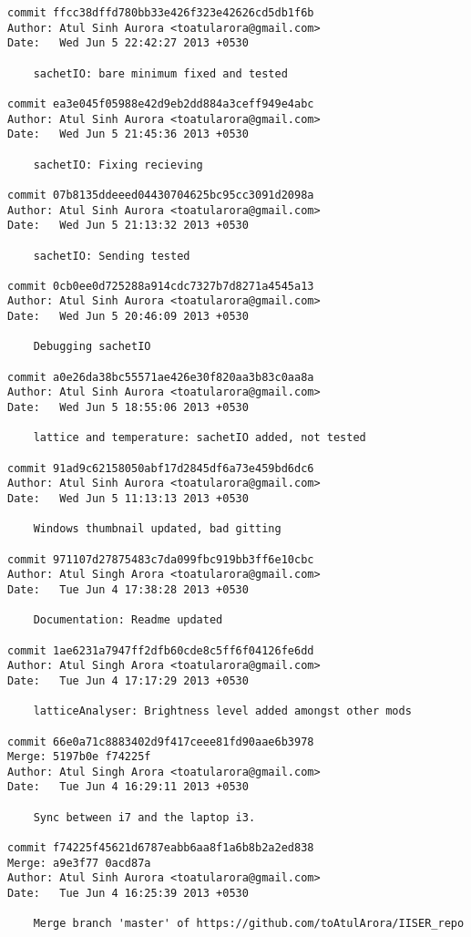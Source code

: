 \begin{lstlisting}
commit ffcc38dffd780bb33e426f323e42626cd5db1f6b
Author: Atul Sinh Aurora <toatularora@gmail.com>
Date:   Wed Jun 5 22:42:27 2013 +0530

    sachetIO: bare minimum fixed and tested

commit ea3e045f05988e42d9eb2dd884a3ceff949e4abc
Author: Atul Sinh Aurora <toatularora@gmail.com>
Date:   Wed Jun 5 21:45:36 2013 +0530

    sachetIO: Fixing recieving

commit 07b8135ddeeed04430704625bc95cc3091d2098a
Author: Atul Sinh Aurora <toatularora@gmail.com>
Date:   Wed Jun 5 21:13:32 2013 +0530

    sachetIO: Sending tested

commit 0cb0ee0d725288a914cdc7327b7d8271a4545a13
Author: Atul Sinh Aurora <toatularora@gmail.com>
Date:   Wed Jun 5 20:46:09 2013 +0530

    Debugging sachetIO

commit a0e26da38bc55571ae426e30f820aa3b83c0aa8a
Author: Atul Sinh Aurora <toatularora@gmail.com>
Date:   Wed Jun 5 18:55:06 2013 +0530

    lattice and temperature: sachetIO added, not tested

commit 91ad9c62158050abf17d2845df6a73e459bd6dc6
Author: Atul Sinh Aurora <toatularora@gmail.com>
Date:   Wed Jun 5 11:13:13 2013 +0530

    Windows thumbnail updated, bad gitting

commit 971107d27875483c7da099fbc919bb3ff6e10cbc
Author: Atul Singh Arora <toatularora@gmail.com>
Date:   Tue Jun 4 17:38:28 2013 +0530

    Documentation: Readme updated

commit 1ae6231a7947ff2dfb60cde8c5ff6f04126fe6dd
Author: Atul Singh Arora <toatularora@gmail.com>
Date:   Tue Jun 4 17:17:29 2013 +0530

    latticeAnalyser: Brightness level added amongst other mods

commit 66e0a71c8883402d9f417ceee81fd90aae6b3978
Merge: 5197b0e f74225f
Author: Atul Singh Arora <toatularora@gmail.com>
Date:   Tue Jun 4 16:29:11 2013 +0530

    Sync between i7 and the laptop i3.

commit f74225f45621d6787eabb6aa8f1a6b8b2a2ed838
Merge: a9e3f77 0acd87a
Author: Atul Sinh Aurora <toatularora@gmail.com>
Date:   Tue Jun 4 16:25:39 2013 +0530

    Merge branch 'master' of https://github.com/toAtulArora/IISER_repo


\end{lstlisting}
